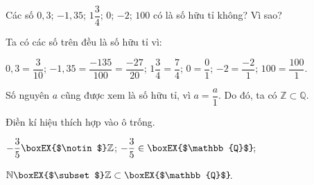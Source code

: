 \begin{vd}
Các số $0,3$; $-1,35$; $1\dfrac{3}{4}$; $0$; $-2$; $100$ có là số hữu tỉ không? Vì sao?
\loigiai
{
Ta có các số trên đều là số hữu tỉ vì:
 \begin{center}
 	$0,3=\dfrac{3}{10}$; $-1,35=\dfrac{-135}{100}=\dfrac{-27}{20}$; $1\dfrac{3}{4}=\dfrac{7}{4}$; $0=\dfrac{0}{1}$; $-2=\dfrac{-2}{1}$; $100=\dfrac{100}{1}$.
 \end{center} 

\begin{note}
Số nguyên $a$ cũng được xem là số hữu tỉ, vì $a=\dfrac{a}{1}$. Do đó, ta có $\mathbb{Z} \subset \mathbb{Q}$.
\end{note}
}
\end{vd}
\begin{vd}
Điền kí hiệu thích hợp vào ô trống.
\begin{listEX}[2]
\item $-\dfrac{3}{5}\boxEX{$\notin$}\mathbb{Z}$; $-\dfrac{3}{5}\in\boxEX{$\mathbb{Q}$}\!$;
\item $\mathbb{N}\boxEX{$\subset$}\mathbb{Z}\subset\boxEX{$\mathbb{Q}$}\!$.
\end{listEX}
\end{vd}
